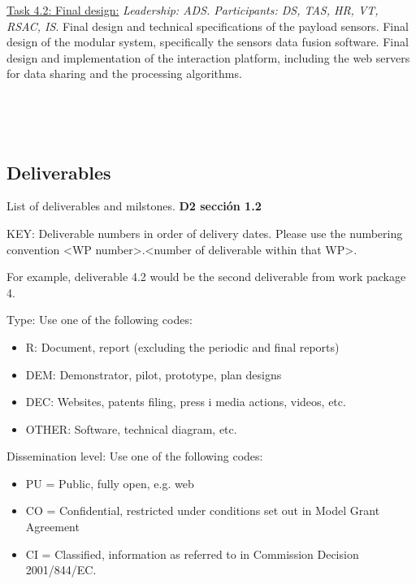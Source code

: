\begin{table}[H]
\begin{tabular}
{{		\underline{Task 4.2: Final design:} \textit{Leadership: ADS. Participants: DS, TAS, HR, VT, RSAC, IS}. Final design and technical specifications of the payload sensors. Final design of the modular system, specifically the sensors data fusion software. Final design and implementation of the interaction platform, including the web servers for data sharing and the processing algorithms. 
		
		 }}\\
		 \hline 
		 
		 \\
		 
		 \hline 
		 
		\end{tabular}
		
		\caption{WP4 description}
		
\end{table}

\subsection{Deliverables}

List of deliverables and milstones. \textbf{D2 sección 1.2}

KEY: Deliverable numbers in order of delivery dates. Please use the numbering convention <WP number>.<number of deliverable within that WP>.

For example, deliverable 4.2 would be the second deliverable from work package 4.

Type: Use one of the following codes:
\begin{itemize}
\item R: Document, report (excluding the periodic and final reports) 
\item DEM: Demonstrator, pilot, prototype, plan designs
\item DEC: Websites, patents filing, press i media actions, videos, etc. 
\item OTHER: Software, technical diagram, etc.
\end{itemize}

Dissemination level: Use one of the following codes:
\begin{itemize}
\item PU = Public, fully open, e.g. web
\item CO = Confidential, restricted under conditions set out in Model Grant Agreement
\item CI = Classified, information as referred to in Commission Decision 2001/844/EC.
\end{itemize}

